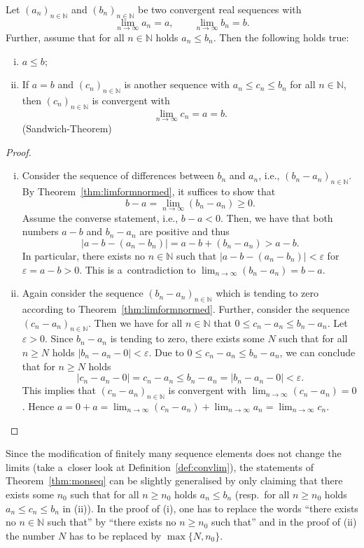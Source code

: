 
\begin{Theorem}\label{thm:monseq}
  Let $(a_n)_{n\in\mathbb{N}}$ and $(b_n)_{n\in\mathbb{N}}$ be two convergent real sequences with
\[\lim_{n\to\infty}a_n=a,\qquad \lim_{n\to\infty}b_n=b.\]
  Further, assume that for all $n\in\mathbb{N}$ holds $a_n\leq b_n$. Then the following holds true:
\begin{enumerate}[(i)]
 \item $a\leq b$;
 \item If $a=b$ and $(c_n)_{n\in\mathbb{N}}$ is another sequence with $a_n\leq c_n\leq b_n$ for all $n \in \mathbb{N}$, then $(c_n)_{n\in\mathbb{N}}$ is convergent with
\[\lim_{n\to\infty}c_n=a=b.\]
 \hfill {(Sandwich-Theorem)}
\end{enumerate}
\end{Theorem}
\begin{proof}
\begin{enumerate}[(i)]
\item 
  Consider the sequence of differences between $b_n$ and $a_n$, i.e., $(b_n-a_n)_{n\in\mathbb{N}}$. By Theorem~\ref{thm:limformnormed}, it suffices to show that
\[b-a=\lim_{n\to\infty}(b_n-a_n)\geq0.\]
Assume the converse statement, i.e., $b-a<0$. Then, we have that both numbers $a-b$ and $b_n-a_n$ are positive and thus
    \[|a-b-(a_n-b_n)|=a-b+(b_n-a_n)>a-b.\] In particular, there exists no $n\in\mathbb{N}$ such that $|a-b-(a_n-b_n)|<\varepsilon$ for $\varepsilon=a-b>0$. This is a~contradiction to $\lim_{n\to\infty}(b_n-a_n)=b-a$.
\item Again consider the sequence $(b_n-a_n)_{n\in\mathbb{N}}$ which is tending to zero according to Theorem~\ref{thm:limformnormed}. Further, consider the sequence $(c_n-a_n)_{n\in\mathbb{N}}$. 
Then we have
  for all $n\in\mathbb{N}$ that $0\leq c_n-a_n\leq b_n-a_n$.
Let $\varepsilon>0$. Since $b_n-a_n$ is tending to zero, there exists some $N$ such that for all $n\geq N$ holds $|b_n-a_n-0|<\varepsilon$. Due to $0\leq c_n-a_n\leq b_n-a_n$, we can conclude that for $n\geq N$ holds
\[|c_n-a_n-0|=c_n-a_n\leq b_n-a_n= |b_n-a_n-0|<\varepsilon.\]
    This implies that $(c_n-a_n)_{n\in\mathbb{N}}$ is convergent with $\lim_{n\to\infty}(c_n-a_n)=0$.
Hence $a=0+a=\lim_{n\rightarrow\infty} (c_n-a_n) + \lim_{n\rightarrow\infty} a_n = \lim_{n\rightarrow\infty} c_n $.
\end{enumerate}
\end{proof}

\begin{Remark}{}\label{rem:n_0mon}
  Since the modification of finitely many sequence elements does not change the limits (take a~closer look at Definition~\ref{def:convlim}), the statements of Theorem~\ref{thm:monseq} can be slightly generalised by only claiming that there exists some $n_0$ such that for all $n\geq n_0$ holds $a_n\leq b_n$ (resp.\ for all $n\geq n_0$ holds $a_n\leq c_n\leq b_n$ in (ii)). In the proof of (i), one has to replace the words ``there exists no $n\in\mathbb{N}$ such that'' by ``there exists no $n\geq n_0$ such that'' and in the proof of (ii) the number $N$ has to be replaced by $\max\{N,n_0\}$.
\end{Remark}

